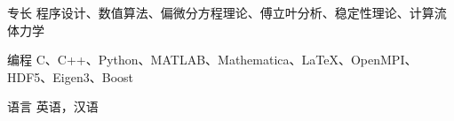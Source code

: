 

\begin{cvskills}
    
  \cvskill
    {专长}
    {程序设计、数值算法、偏微分方程理论、傅立叶分析、稳定性理论、计算流体力学}

  \cvskill
    {编程} %
    {C、C++、Python、MATLAB、Mathematica、LaTeX、OpenMPI、HDF5、Eigen3、Boost} %

  \cvskill
    {语言} %
    {英语，汉语} %

\end{cvskills}
